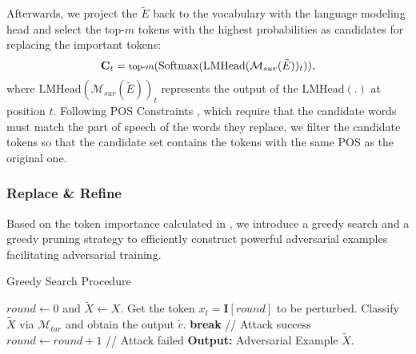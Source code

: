 Afterwards, we project the $\tilde{E}$ back to the vocabulary with the language modeling head and select the top-$m$ tokens with the highest probabilities as candidates for replacing the important tokens:
\begin{equation}
\label{eq:7}
\footnotesize
\mathbf{C}_t = \text{top-$m$}(\mathrm{Softmax}(\mathrm{LMHead}(\mathcal{M}_{sur}(\tilde{E}))_t)), 
\end{equation}
where $\mathrm{LMHead}(\mathcal{M}_{sur}(\tilde{E}))_t$ represents the output of the $\mathrm{LMHead}(.)$ at position $t$.
Following POS Constraints \cite{zhou2024humanizing}, which require that the candidate words must match the part of speech of the words they replace, we filter the candidate tokens so that the candidate set contains the tokens with the same POS as the original one.

\subsubsection{Replace \& Refine}\label{AEE}
Based on the token importance calculated in , we introduce a greedy search and a greedy pruning strategy to efficiently construct powerful adversarial examples facilitating adversarial training.
 
\begin{algorithm}[t]
\small
\caption{Greedy Search Procedure}
\label{alg:algorithm2_short}
\begin{algorithmic}[1]
    \State $round \leftarrow 0$ and $\tilde{X} \leftarrow X$.
       \State Get the token $x_{t}=\mathbf{I}[round]$ to be perturbed.
       \State Classify $\tilde{X}$ via $\mathcal{M}_{tar}$ and obtain the output $\tilde{c}$.
          \State \textbf{break} \quad // Attack success
       \Else
          \State $round \leftarrow round + 1$
          \quad // Attack failed
       \EndIf
    \EndWhile
    \State \textbf{Output:} Adversarial Example $\tilde{X}$.
\end{algorithmic}
\end{algorithm}

